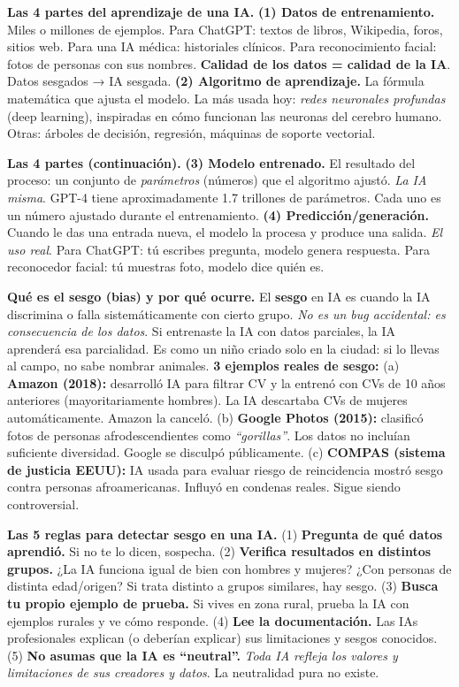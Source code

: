 \documentclass[11pt,letterpaper]{article}
\newcommand{\milcpaso}[3]{%
\Needspace{4\baselineskip}%
\begin{tcolorbox}[enhanced,colback=white,colframe=milcLinea,arc=1.5mm,boxrule=.9pt,
  left=14mm,right=4mm,top=3mm,bottom=3mm,before skip=4pt,after skip=4pt,
  fontupper=\RaggedRight,
  overlay={\node[anchor=north west,circle,fill=#2,text=white,inner sep=0pt,
    minimum size=7.4mm,font=\sffamily\bfseries\small]
    at ([xshift=3.6mm,yshift=-3.2mm]frame.north west) {#1};}]
#3
\end{tcolorbox}}
\begin{document}
\milcpaso{1}{milcTurquesa}{\textbf{Las 4 partes del aprendizaje de una IA.} \textbf{(1) Datos de entrenamiento.} Miles o millones de ejemplos. Para ChatGPT: textos de libros, Wikipedia, foros, sitios web. Para una IA médica: historiales clínicos. Para reconocimiento facial: fotos de personas con sus nombres. \textbf{Calidad de los datos = calidad de la IA}. Datos sesgados → IA sesgada. \textbf{(2) Algoritmo de aprendizaje.} La fórmula matemática que ajusta el modelo. La más usada hoy: \emph{redes neuronales profundas} (deep learning), inspiradas en cómo funcionan las neuronas del cerebro humano. Otras: árboles de decisión, regresión, máquinas de soporte vectorial.}
\milcpaso{2}{milcTurquesa}{\textbf{Las 4 partes (continuación).} \textbf{(3) Modelo entrenado.} El resultado del proceso: un conjunto de \emph{parámetros} (números) que el algoritmo ajustó. \emph{La IA misma}. GPT-4 tiene aproximadamente 1.7 trillones de parámetros. Cada uno es un número ajustado durante el entrenamiento. \textbf{(4) Predicción/generación.} Cuando le das una entrada nueva, el modelo la procesa y produce una salida. \emph{El uso real}. Para ChatGPT: tú escribes pregunta, modelo genera respuesta. Para reconocedor facial: tú muestras foto, modelo dice quién es.}
\milcpaso{3}{milcTurquesa}{\textbf{Qué es el sesgo (bias) y por qué ocurre.} El \textbf{sesgo} en IA es cuando la IA discrimina o falla sistemáticamente con cierto grupo. \emph{No es un bug accidental: es consecuencia de los datos}. Si entrenaste la IA con datos parciales, la IA aprenderá esa parcialidad. Es como un niño criado solo en la ciudad: si lo llevas al campo, no sabe nombrar animales. \textbf{3 ejemplos reales de sesgo:} (a) \textbf{Amazon (2018):} desarrolló IA para filtrar CV y la entrenó con CVs de 10 años anteriores (mayoritariamente hombres). La IA descartaba CVs de mujeres automáticamente. Amazon la canceló. (b) \textbf{Google Photos (2015):} clasificó fotos de personas afrodescendientes como \emph{``gorillas''}. Los datos no incluían suficiente diversidad. Google se disculpó públicamente. (c) \textbf{COMPAS (sistema de justicia EEUU):} IA usada para evaluar riesgo de reincidencia mostró sesgo contra personas afroamericanas. Influyó en condenas reales. Sigue siendo controversial.}
\milcpaso{4}{milcTurquesa}{\textbf{Las 5 reglas para detectar sesgo en una IA.} (1) \textbf{Pregunta de qué datos aprendió.} Si no te lo dicen, sospecha. (2) \textbf{Verifica resultados en distintos grupos.} ¿La IA funciona igual de bien con hombres y mujeres? ¿Con personas de distinta edad/origen? Si trata distinto a grupos similares, hay sesgo. (3) \textbf{Busca tu propio ejemplo de prueba.} Si vives en zona rural, prueba la IA con ejemplos rurales y ve cómo responde. (4) \textbf{Lee la documentación.} Las IAs profesionales explican (o deberían explicar) sus limitaciones y sesgos conocidos. (5) \textbf{No asumas que la IA es ``neutral''.} \emph{Toda IA refleja los valores y limitaciones de sus creadores y datos}. La neutralidad pura no existe.}
\end{document}
